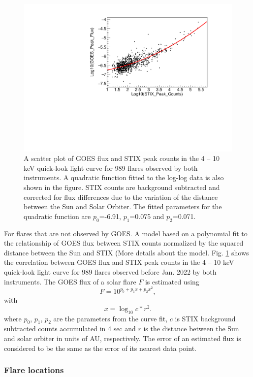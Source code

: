 \documentclass{aa}
\begin{document}
\begin{figure}
  \centering
  \includegraphics[width=0.8\linewidth]{figures/goes-stix-scatter.pdf}
  \caption{A scatter plot of GOES flux and STIX peak counts in the 4 -- 10 keV quick-look light curve for 989 flares observed by both instruments.
A quadratic function fitted to the log-log data is also shown in the figure. 
STIX counts are background subtracted and 
corrected for flux differences due to the variation of the distance between the Sun and Solar Orbiter. 
The fitted parameters for the quadratic function  are $p_0$=-6.91, $p_1$=0.075 and $p_2$=0.071. 
}
\label{fig:goes-stix}
\end{figure}
For flares that are not observed by GOES. 
A model based on a polynomial fit to the relationship of GOES flux between  STIX counts normalized by the 
squared distance between the Sun and STIX (More details about the model.
Fig. \ref{fig:goes-stix} shows the correlation between GOES flux and STIX peak counts in the 4 -- 10 keV quick-look light curve
for 989 flares observed before Jan. 2022 by both instruments. 
The GOES flux of a solar flare $F$ is estimated using
\begin{equation}
F=10^{p_0+p_1 x+p_2 x^2},
\end{equation}
with
\begin{equation}
 x=\log_{10} {c*r^2}.
\end{equation}
where $p_0$, $p_1$, $p_2$ are the parameters from the curve fit, 
$c$ is STIX background subtracted  counts accumulated in 4 sec and $r$ is 
the distance between the Sun and solar orbiter in units of AU, respectively.
The error of an estimated flux is considered to be the same as the error 
of its nearest data point.

\subsubsection{Flare locations}
\end{document}

